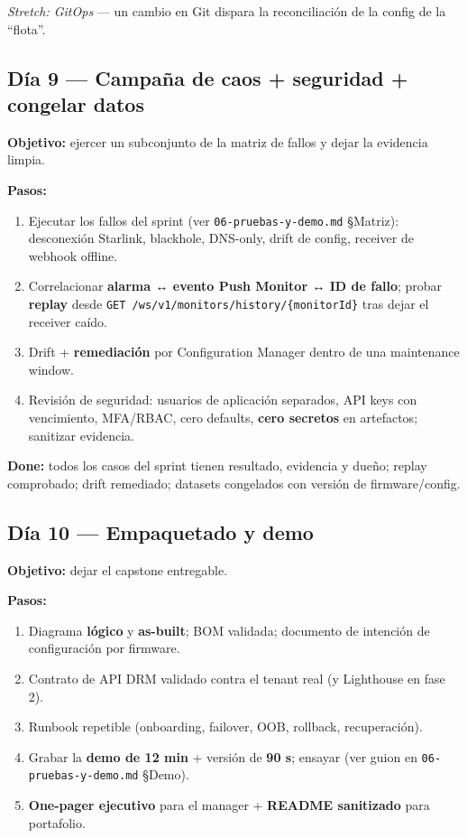 \documentclass[11pt,a4paper]{article}
\newcommand{\file}[1]{\texttt{#1}}
\newcommand{\done}{\textbf{Done:}}
\newcommand{\stretchgoal}[1]{\textit{Stretch: #1}}
\begin{document}
\begin{nota}
\small
\stretchgoal{GitOps} — un cambio en Git dispara la reconciliación de la config de la ``flota''.
\end{nota}

\subsection{Día 9 — Campaña de caos + seguridad + congelar datos}

\textbf{Objetivo:} ejercer un subconjunto de la matriz de fallos y dejar la evidencia limpia.

\textbf{Pasos:}
\begin{enumerate}
  \item Ejecutar los fallos del sprint (ver \file{06-pruebas-y-demo.md} §Matriz):
        desconexión Starlink, blackhole, DNS-only, drift de config, receiver de webhook offline.
  \item Correlacionar \textbf{alarma ↔ evento Push Monitor ↔ ID de fallo}; probar
        \textbf{replay} desde \file{GET /ws/v1/monitors/history/\{monitorId\}} tras dejar el
        receiver caído.
  \item Drift + \textbf{remediación} por Configuration Manager dentro de una maintenance window.
  \item Revisión de seguridad: usuarios de aplicación separados, API keys con vencimiento,
        MFA/RBAC, cero defaults, \textbf{cero secretos} en artefactos; sanitizar evidencia.
\end{enumerate}

\begin{clave}
\small
\done{} todos los casos del sprint tienen resultado, evidencia y dueño; replay comprobado;
drift remediado; datasets congelados con versión de firmware/config.
\end{clave}

\subsection{Día 10 — Empaquetado y demo}

\textbf{Objetivo:} dejar el capstone entregable.

\textbf{Pasos:}
\begin{enumerate}
  \item Diagrama \textbf{lógico} y \textbf{as-built}; BOM validada; documento de intención de
        configuración por firmware.
  \item Contrato de API DRM validado contra el tenant real (y Lighthouse en fase 2).
  \item Runbook repetible (onboarding, failover, OOB, rollback, recuperación).
  \item Grabar la \textbf{demo de 12 min} + versión de \textbf{90 s}; ensayar
        (ver guion en \file{06-pruebas-y-demo.md} §Demo).
  \item \textbf{One-pager ejecutivo} para el manager + \textbf{README sanitizado} para
        portafolio.
\end{enumerate}
\end{document}
